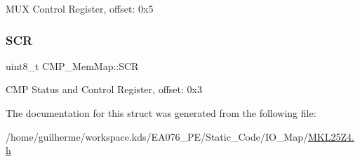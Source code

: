 M\+UX Control Register, offset\+: 0x5 \mbox{\label{struct_c_m_p___mem_map_a3fe55f0243869b50fc54acb9c194d970}} 
\subsubsection{\texorpdfstring{S\+CR}{SCR}}
{\footnotesize\ttfamily uint8\+\_\+t C\+M\+P\+\_\+\+Mem\+Map\+::\+S\+CR}

C\+MP Status and Control Register, offset\+: 0x3 

The documentation for this struct was generated from the following file\+:\begin{DoxyCompactItemize}
\item 
/home/guilherme/workspace.\+kds/\+E\+A076\+\_\+\+P\+E/\+Static\+\_\+\+Code/\+I\+O\+\_\+\+Map/\hyperlink{_m_k_l25_z4_8h}{M\+K\+L25\+Z4.\+h}\end{DoxyCompactItemize}
